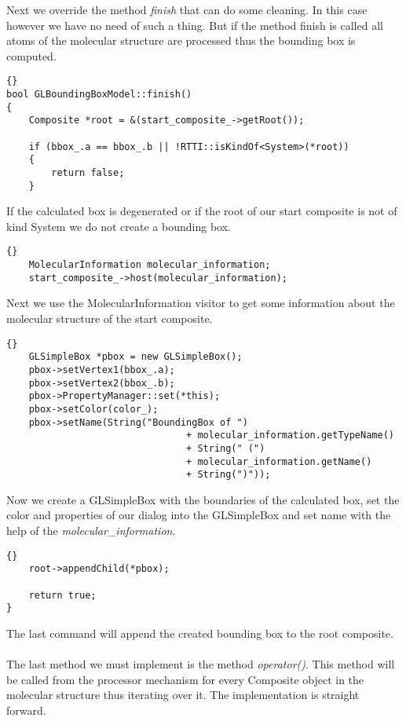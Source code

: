 Next we override the method {\em finish} that can do some cleaning. In this case
however we have no need of such a thing. But if the method finish is called
all atoms of the molecular structure are processed thus the bounding box is computed.

\begin{lstlisting}{}
bool GLBoundingBoxModel::finish()
{
	Composite *root = &(start_composite_->getRoot());

	if (bbox_.a == bbox_.b || !RTTI::isKindOf<System>(*root))
	{
		return false;
	}
\end{lstlisting}

If the calculated box is degenerated or if the root of our start composite is
not of kind System we do not create a bounding box.

\begin{lstlisting}{}
	MolecularInformation molecular_information;
	start_composite_->host(molecular_information);                        
\end{lstlisting}

Next we use the MolecularInformation visitor to get some information about the
molecular structure of the start composite.

\begin{lstlisting}{}
	GLSimpleBox *pbox = new GLSimpleBox();
	pbox->setVertex1(bbox_.a);
	pbox->setVertex2(bbox_.b);
	pbox->PropertyManager::set(*this);
	pbox->setColor(color_);
	pbox->setName(String("BoundingBox of ")
								+ molecular_information.getTypeName()
								+ String(" (")
								+ molecular_information.getName()
								+ String(")"));
\end{lstlisting}

Now we create a GLSimpleBox with the boundaries of the calculated box, set the
color and properties of our dialog into the GLSimpleBox and set name with the help
of the {\em molecular\_information}.
																										 
\begin{lstlisting}{}
	root->appendChild(*pbox);

	return true;
}
\end{lstlisting}

The last command will append the created bounding box to the root composite.\\ \\

The last method we must implement is the method {\em operator()}. This method
will be called from the processor mechanism for every Composite object
in the molecular structure thus iterating over it.
The implementation is straight forward.

